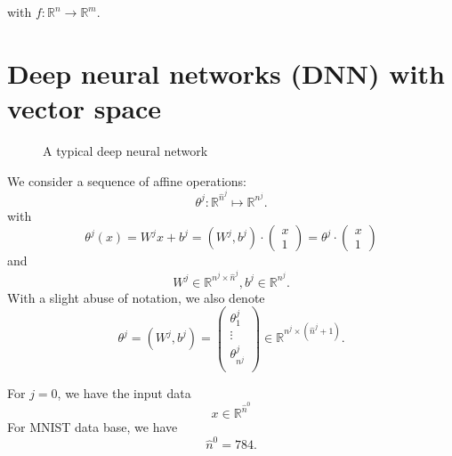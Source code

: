 with $f: \mathbb{R}^n \to \mathbb{R}^m$.

\section{Deep neural networks (DNN) with vector space}
\begin{figure}[!ht]        
\caption{A typical deep neural network}      
\end{figure}
We consider a sequence of affine operations:
\begin{equation}
\theta^j: \mathbb R^{\hat{n}^{j}}\mapsto \mathbb R^{ n^{j}}.   
\end{equation}
with
\begin{equation}\label{DNN_affinemap}
\theta^j(x) =  W^j x + b^j 
=
(W^j, b^j) \cdot
\begin{pmatrix}
  x \\
1
\end{pmatrix}
=
\theta^j \cdot
\begin{pmatrix}
  x \\
1
\end{pmatrix}
\end{equation}
and 
\begin{equation}
W^j\in \mathbb R^{n^j \times  \hat n^{j}}, b^j\in \mathbb R^{n^j}.
\end{equation}
With a slight abuse of notation, we also denote
\begin{equation}
\theta^j=(W^j, b^j)
=
\begin{pmatrix}
\theta^j_{1}\\
\vdots \\  
\theta^j_{n^j}\\
\end{pmatrix}
\in \mathbb R^{n^j\times (\hat n^{j}+1)}.
\end{equation}

For $j=0$, we have the input data 
$$
x\in \mathbb R^{\hat n^{0}}
$$
For MNIST data base, we have
$$
\hat n^0 = 784.
$$

